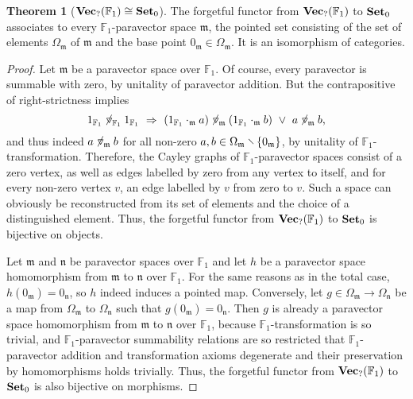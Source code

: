 \documentclass{article}
\theoremstyle{definition}
\newtheorem{theorem}[definition]{Theorem}
\newcommand{\impl}{~\Rightarrow~}
\newcommand{\disj}{~\lor~}
\newcommand{\ntridown}{\mathbin{\raisebox{.065em}{$\not$}\hspace{.19em}\raisebox{.02em}{\rotatebox[origin=c]{90}{$\triangleleft$}}}}
\newcommand{\ncomp}{\ntridown}
\newcommand{\diff}{\mathbin{\hspace{-.2em}\raisebox{.06em}{\rotatebox[origin=c]{-45}{$-$}\hspace{-.24em}}}}
\begin{document}
\begin{theorem}[\(\text{\bf Vec}_?(\mathbb{F}_1)\cong\text{\bf Set}_0\)]
The forgetful functor from \(\text{\bf Vec}_?(\mathbb{F}_1)\) to \(\text{\bf Set}_0\) associates to every \(\mathbb{F}_1\)-paravector space \(\mathfrak{m}\), the pointed set consisting of the set of elements \(\Omega_\mathfrak{m}\) of \(\mathfrak{m}\) and the base point \(0_\mathfrak{m}\in\Omega_\mathfrak{m}\). It is an isomorphism of categories.
\vspace{-6pt}
\begin{proof}
Let \(\mathfrak{m}\) be a paravector space over \(\mathbb{F}_1\). Of course, every paravector is summable with zero, by unitality of paravector addition. But the contrapositive of right-strictness implies \[1_{\mathbb{F}_1}\ncomp_{\mathbb{F}_1}1_{\mathbb{F}_1}\impl(1_{\mathbb{F}_1}\cdot_\mathfrak{m}a)\ncomp_\mathfrak{m}(1_{\mathbb{F}_1}\cdot_\mathfrak{m}b)\disj a\ncomp_\mathfrak{m}b\text{,}\] and thus indeed \(a\ncomp_\mathfrak{m}b\) for all non-zero \(a,b\in\Omega_\mathfrak{m}\diff\{0_\mathfrak{m}\}\), by unitality of \(\mathbb{F}_1\)-transformation. Therefore, the Cayley graphs of \(\mathbb{F}_1\)-paravector spaces consist of a zero vertex, as well as edges labelled by zero from any vertex to itself, and for every non-zero vertex \(v\), an edge labelled by \(v\) from zero to \(v\). Such a space can obviously be reconstructed from its set of elements and the choice of a distinguished element. Thus, the forgetful functor from \(\text{\bf Vec}_?(\mathbb{F}_1)\) to \(\text{\bf Set}_0\) is bijective on objects.

Let \(\mathfrak{m}\) and \(\mathfrak{n}\) be paravector spaces over \(\mathbb{F}_1\) and let \(h\) be a paravector space homomorphism from \(\mathfrak{m}\) to \(\mathfrak{n}\) over \(\mathbb{F}_1\). For the same reasons as in the total case, \(h(0_\mathfrak{m})=0_\mathfrak{n}\), so \(h\) indeed induces a pointed map. Conversely, let \(g\in\Omega_\mathfrak{m}\to\Omega_\mathfrak{n}\) be a map from \(\Omega_\mathfrak{m}\) to \(\Omega_\mathfrak{n}\) such that \(g(0_\mathfrak{m})=0_\mathfrak{n}\). Then \(g\) is already a paravector space homomorphism from \(\mathfrak{m}\) to \(\mathfrak{n}\) over \(\mathbb{F}_1\), because \(\mathbb{F}_1\)-transformation is so trivial, and \(\mathbb{F}_1\)-paravector summability relations are so restricted that \(\mathbb{F}_1\)-paravector addition and transformation axioms degenerate and their preservation by homomorphisms holds trivially. Thus, the forgetful functor from \(\text{\bf Vec}_?(\mathbb{F}_1)\) to \(\text{\bf Set}_0\) is also bijective on morphisms.
\end{proof}
\end{theorem}
\end{document}
